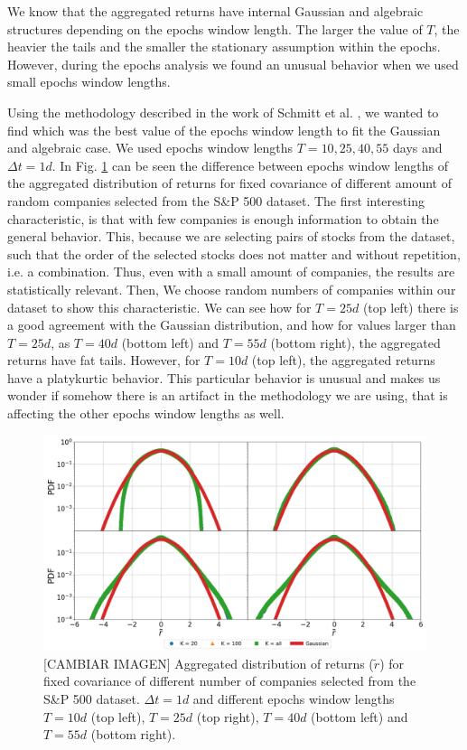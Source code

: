 We know that the aggregated returns have internal Gaussian and algebraic
structures depending on the epochs window length. The larger the value of $T$,
the heavier the tails and the smaller the stationary assumption within the
epochs. However, during the epochs analysis we found an unusual behavior when
we used small epochs window lengths.

Using the methodology described in the work of Schmitt et al.
\cite{non_stationarity_fin_guhr}, we wanted to find which was the best value of
the epochs window length to fit the Gaussian and algebraic case. We used epochs
window lengths $T = 10, 25, 40, 55$ days and $\Delta t = 1d$. In Fig.
\ref{fig:window_comparison} can be seen the difference between epochs
window lengths of the aggregated distribution of returns for fixed covariance
of different amount of random companies selected from the S\&P 500 dataset.
The first interesting characteristic, is that with few companies is enough
information to obtain the general behavior. This, because we are selecting
pairs of stocks from the dataset, such that the order of the selected stocks
does not matter and without repetition, i.e. a combination. Thus, even with
a small amount of companies, the results are statistically relevant. Then, We
choose random numbers of companies within our dataset to show this
characteristic. We can see how for $T=25d$ (top left) there is a good agreement
with the Gaussian distribution, and how for values larger than $T=25d$, as
$T=40d$ (bottom left) and $T=55d$ (bottom right), the aggregated returns have
fat tails. However, for $T=10d$ (top left), the aggregated returns have a
platykurtic behavior. This particular behavior is unusual and makes us wonder
if somehow there is an artifact in the methodology we are using, that is
affecting the other epochs window lengths as well.

\begin{figure}[htbp]
    \centering
    \includegraphics[width=0.8\columnwidth]
    {figures/05_window_comparison.png}
    \caption{[CAMBIAR IMAGEN] Aggregated distribution of returns ($\tilde{r}$) for fixed
             covariance of different number of companies selected from the S\&P
             500 dataset. $\Delta t = 1d$ and different epochs window lengths
             $T=10d$ (top left), $T=25d$ (top right), $T=40d$ (bottom left) and
             $T=55d$ (bottom right).}
    \label{fig:window_comparison}
\end{figure}

